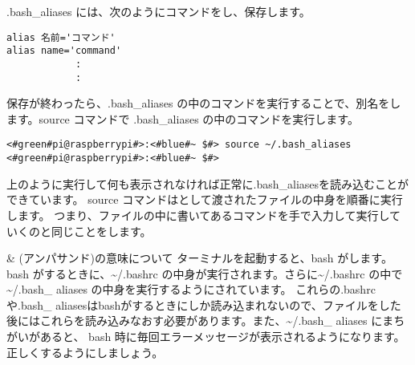 .bash{\_}aliases には、次のようにコマンドをし、保存します。
\begin{lstlisting}[caption=\textasciitilde/.bash\_aliasesの書き方1, label=bashAliasesGrammar1]
alias 名前='コマンド'
alias name='command'
            :
            :
\end{lstlisting}

保存が終わったら、.bash{\_}aliases の中のコマンドを実行することで、別名をします。source コマンドで .bash{\_}aliases の中のコマンドを実行します。
\begin{lstlisting}[caption=\textasciitilde/.bash\_aliasesの読込, label=sourceBashAliases]
<#green#pi@raspberrypi#>:<#blue#~ $#> source ~/.bash_aliases
<#green#pi@raspberrypi#>:<#blue#~ $#>
\end{lstlisting}
上のように実行して何も表示されなければ正常に.bash\_aliasesを読み込むことができています。
source コマンドはとして渡されたファイルの中身を順番に実行します。
つまり、ファイルの中に書いてあるコマンドを手で入力して実行していくのと同じことをします。

\begin{itembox}[c]{\& (アンパサンド)の意味について}
    ターミナルを起動すると、bash がします。bash がするときに、\textasciitilde/.bashrc の中身が実行されます。さらに\textasciitilde/.bashrc の中で \textasciitilde/.bash\_ aliases の中身を実行するようにされています。
    これらの.bashrcや.bash\_ aliasesはbashがするときにしか読み込まれないので、ファイルをした後にはこれらを読み込みなおす必要があります。また、\textasciitilde/.bash\_ aliases にまちがいがあると、
    bash 時に毎回エラーメッセージが表示されるようになります。正しくするようにしましょう。
\end{itembox}

\begin{tcolorbox}[title=\useOmetoi]
    \begin{enumerate}
    \end{enumerate}
\end{tcolorbox}

